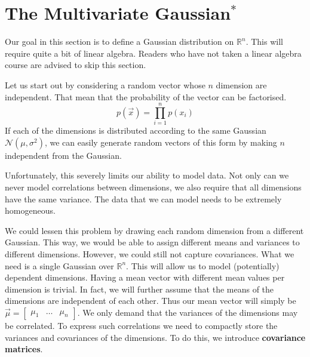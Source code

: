 \documentclass[a4paper,11pt,leqno]{report}\usepackage[]{graphicx}\usepackage[]{color}
\newcommand{\N}[2]{\mathcal{N}\left( #1, #2 \right)}
\begin{document}
%

\section{The Multivariate Gaussian$ ^{*} $}\label{sec:mvGauss}

Our goal in this section is to define a Gaussian distribution on $ \mathbb{R}^{n} $. This will require quite a bit of linear algebra. Readers who have not taken
a linear algebra course are advised to skip this section.

Let us start out by considering a random vector whose $ n $ dimension are independent. That mean that the probability of the vector can be factorised.
\begin{equation}
p(\vec{x}) = \prod_{i=1}^{n} p(x_{i})
\end{equation}
If each of the dimensions is distributed according to the same Gaussian $ \mathcal{N}(\mu, \sigma^{2}) $, we can easily generate random vectors of this form 
by making $ n $ independent from the Gaussian.

Unfortunately, this severely limits our ability to model data. Not only can we never model correlations between dimensions, we also require that all dimensions
have the same variance. The data that we can model needs to be extremely homogeneous.

We could lessen this problem by drawing each random dimension from a different Gaussian. This way, we would be able to assign different means and variances to different
dimensions. However, we could still not capture covariances. What we need is a single Gaussian over $ \mathbb{R}^{n} $. This will allow us to model (potentially) dependent
dimensions. Having a mean vector with different mean values per dimension is trivial. In fact, we will further assume that the means of the dimensions are independent of
each other. Thus our mean vector will simply be 
$ \vec{\mu} = \begin{bmatrix}
\mu_{1} & \ldots & \mu_{n}
\end{bmatrix} $. We only demand that the variances of the dimensions may be correlated. To express such correlations we need to compactly store the variances and 
covariances of the dimensions. To do this, we introduce \textbf{covariance matrices}.
\end{document}
